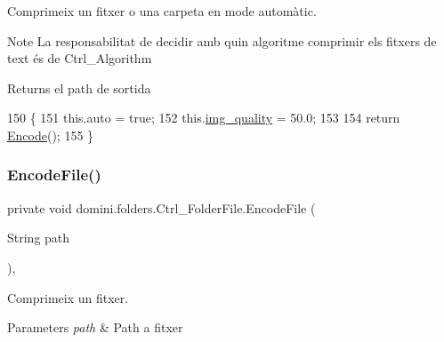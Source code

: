 Comprimeix un fitxer o una carpeta en mode automàtic. 

\begin{DoxyNote}{Note}
La responsabilitat de decidir amb quin algoritme comprimir els fitxers de text és de Ctrl\+\_\+\+Algorithm 
\end{DoxyNote}
\begin{DoxyReturn}{Returns}
el path de sortida 
\end{DoxyReturn}

\begin{DoxyCode}
150                                \{
151         this.\textcolor{keyword}{auto} = \textcolor{keyword}{true};
152         this.\hyperlink{classdomini_1_1folders_1_1Ctrl__FolderFile_a7990a74c394d53a58ebbf4a7872c700d}{img\_quality} = 50.0;
153 
154         \textcolor{keywordflow}{return} \hyperlink{classdomini_1_1folders_1_1Ctrl__FolderFile_a7c47fd5127ae6f713a4fa7f75002a6f6}{Encode}();
155     \}
\end{DoxyCode}
\mbox{\label{classdomini_1_1folders_1_1Ctrl__FolderFile_a0b2b642b6c23124539d0306955be7f0c}} 
\subsubsection{\texorpdfstring{Encode\+File()}{EncodeFile()}}
{\footnotesize\ttfamily private void domini.\+folders.\+Ctrl\+\_\+\+Folder\+File.\+Encode\+File (\begin{DoxyParamCaption}\item[{String}]{path }\end{DoxyParamCaption})\hspace{0.3cm}{\ttfamily [inline]}, {\ttfamily [private]}}



Comprimeix un fitxer. 


\begin{DoxyParams}{Parameters}
{\em path} & Path a fitxer \\
\hline
\end{DoxyParams}

